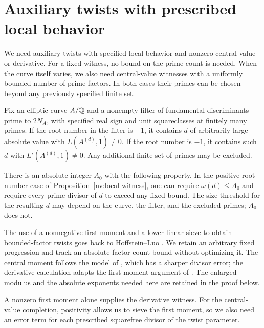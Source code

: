 \section{Auxiliary twists with prescribed local behavior}\label{sec:nonvanishing}

We need auxiliary twists with specified local behavior and nonzero
central value or derivative. For a fixed witness, no bound on the prime
count is needed. When the curve itself varies, we also need central-value
witnesses with a uniformly bounded number of prime factors. In both cases
their primes can be chosen beyond any previously specified finite set.

\begin{proposition}\label{nv:local-witness}
Fix an elliptic curve $A/\mathbb Q$ and a nonempty filter of fundamental
discriminants prime to $2N_A$, with specified real sign and unit
squareclasses at finitely many primes. If the root number in the filter
is $+1$, it contains $d$ of arbitrarily large absolute value with
$L(A^{(d)},1)\ne0$.
If the root number is $-1$, it contains such $d$ with
$L'(A^{(d)},1)\ne0$. Any additional finite set of primes may be excluded.
\end{proposition}

\begin{proposition}\label{nv:rough}
There is an absolute integer $A_0$ with the following property.
In the positive-root-number case of Proposition~\ref{nv:local-witness},
one can require $\omega(d)\le A_0$ and require every prime divisor of
$d$ to exceed any fixed bound.
The size threshold for the resulting $d$ may depend on the curve, the
filter, and the excluded primes; $A_0$ does not.
\end{proposition}

The use of a nonnegative first moment and a lower linear sieve to obtain
bounded-factor twists goes back to Hoffstein--Luo
\cite[\S2]{HoffsteinLuo1997}. We retain an arbitrary fixed progression
and track an absolute factor-count bound without optimizing it.
The central moment follows the model of
\cite[Proposition~2]{RadziwillSoundararajan2015}, which has a sharper
divisor error; the derivative calculation adapts the first-moment
argument of \cite{Iwaniec1990}. The enlarged modulus and the absolute
exponents needed here are retained in the proof below.

A nonzero first moment alone supplies the derivative witness. For the
central-value completion, positivity allows us to sieve the first
moment, so we also need an error term for each prescribed squarefree
divisor of the twist parameter.

